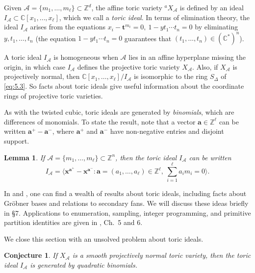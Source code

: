 \documentclass{amsart}
\theoremstyle{plain}
\newtheorem{lemma}[theorem]{Lemma}
\newtheorem{conjecture}[theorem]{Conjecture}
\theoremstyle{definition}
\begin{document}
	Given $\mathcal{A} = \{m_1,\dots,m_\ell\} \subset \mathbb{Z}^d$, the
affine toric variety ${}^a\!X_{\mathcal{A}}$ is defined by an ideal
$I_{\mathcal{A}} \subset \mathbb{C}[x_1,\dots,x_\ell]$, which we call a {\it
toric ideal\/}.  In terms of elimination theory, the ideal
$I_{\mathcal{A}}$ arises from the equations $x_i - \mathbf{t}^{m_i} = 0,\
1-yt_1\cdots t_n = 0$ by eliminating $y,t_1,\dots,t_n$ (the equation
$1-yt_1\cdots t_n = 0$ guarantees that $(t_1,\dots,t_n) \in (\mathbb{C}^*)^n$).

	A toric ideal $I_{\mathcal{A}}$ is homogeneous when $\mathcal{A}$
lies in an affine hyperplane missing the origin, in which case
$I_{\mathcal{A}}$ defines the projective toric variety $X_{\mathcal{A}}$.
Also, if $X_{\mathcal{A}}$ is projectively normal, then $\mathbb{C}[x_1,\dots,x_\ell]/I_{\mathcal{A}}$ is isomorphic to the ring $S_\Delta$
of \eqref{eq:5.3}.  So facts about toric ideals give useful information
about the coordinate rings of projective toric varieties.

	As with the twisted cubic, toric ideals are generated by {\it
binomials\/}, which are differences of monomials.  To state the
result, note that a vector $\mathbf{a} \in \mathbb{Z}^\ell$ can be written
$\mathbf{a}^+ - \mathbf{a}^-$, where $\mathbf{a}^+$ and $\mathbf{a}^-$ have
non-negative entries and disjoint support.

\begin{lemma} If $\mathcal{A} = \{m_1,\dots,m_\ell\} \subset \mathbb{Z}^n$, then the toric ideal $I_{\mathcal{A}}$ can be written
\[
I_{\mathcal{A}} = \langle \mathbf{x}^{\mathbf{a}^+} - \mathbf{x}^{\mathbf{a}^-} :
\mathbf{a} = (a_1,\dots,a_\ell) \in \mathbb{Z}^\ell,\
\textstyle{\sum_{i=1}^\ell} a_im_i = 0\rangle.
\]
\end{lemma}

	In \cite{Stu1} and \cite{Stu2}, one can find a wealth of
results about toric ideals, including facts about Gr\"obner bases and 
relations to secondary fans.  We will discuss these ideas briefly in
\S7.  Applications to enumeration, sampling, integer programming, and
primitive partition identities are given in \cite{Stu2}, Ch.~5 and 6.

	We close this section with an unsolved problem about toric
ideals.

\begin{conjecture} If $X_{\mathcal{A}}$ is a smooth projectively
normal toric variety, then the toric ideal $I_{\mathcal{A}}$ is generated
by quadratic binomials.
\end{conjecture}
\end{document}

